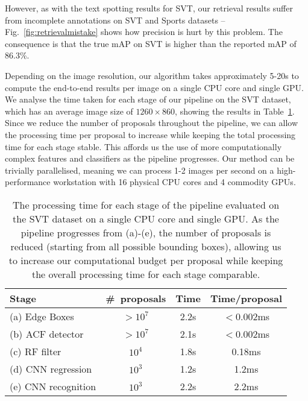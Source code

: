 \documentclass[twocolumn]{svjour3}          \smartqed  \usepackage{epsfig}
\begin{document}
However, as with the text spotting results for SVT, our retrieval results suffer from incomplete annotations on SVT and Sports datasets -- Fig.~\ref{fig:retrievalmistake} shows how precision is hurt by this problem. The consequence is that the true mAP on SVT is higher than the reported mAP of 86.3\%. 

Depending on the image resolution, our algorithm takes approximately 5-20s to compute the end-to-end results per image on a single CPU core and single GPU. We analyse the time taken for each stage of our pipeline on the SVT dataset, which has an average image size of $1260 \times 860$, showing the results in Table~\ref{table:timings}. Since we reduce the number of proposals throughout the pipeline, we can allow the processing time per proposal to increase while keeping the total processing time for each stage stable. This affords us the use of more computationally complex features and classifiers as the pipeline progresses. Our method can be trivially parallelised, meaning we can process 1-2 images per second on a high-performance workstation with 16 physical CPU cores and 4 commodity GPUs. 





\begin{table}
\begin{center}
\footnotesize
\begin{tabular}{|l|c|c|c|} \hline
Stage & \#~proposals & Time & Time/proposal\\
\hline\hline
(a) Edge Boxes & $> 10^7$ & 2.2s & $<0.002$ms\\
(b) ACF detector & $> 10^7$ & 2.1s & $<0.002$ms\\
(c) RF filter & $10^4$ & 1.8s & 0.18ms\\
(d) CNN regression & $10^3$ & 1.2s & 1.2ms\\
(e) CNN recognition & $10^3$ & 2.2s & 2.2ms\\
\hline
\end{tabular}
\caption{The processing time for each stage of the pipeline evaluated on the SVT dataset on a single CPU core and single GPU. As the pipeline progresses from (a)-(e), the number of proposals is reduced (starting from all possible bounding boxes), allowing us to increase our computational budget per proposal while keeping the overall processing time for each stage comparable.}
\label{table:timings}
\end{center}
\end{table}
\end{document}
